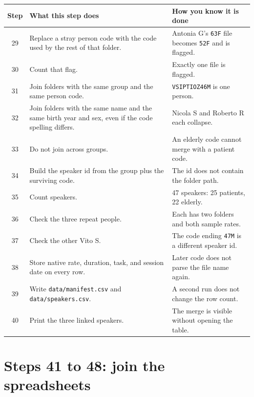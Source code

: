 \documentclass[11pt]{article}
\begin{document}
\begin{longtable}{cp{6.4cm}p{6.4cm}}
\toprule
Step & What this step does & How you know it is done \\
\midrule
\endhead
29 & Replace a stray person code with the code used by the rest of that folder. & Antonia G's \texttt{63F} file becomes \texttt{52F} and is flagged. \\
30 & Count that flag. & Exactly one file is flagged. \\
31 & Join folders with the same group and the same person code. & \texttt{VSIPTIOZ46M} is one person. \\
32 & Join folders with the same name and the same birth year and sex, even if the code spelling differs. & Nicola S and Roberto R each collapse. \\
33 & Do not join across groups. & An elderly code cannot merge with a patient code. \\
34 & Build the speaker id from the group plus the surviving code. & The id does not contain the folder path. \\
35 & Count speakers. & 47 speakers: 25 patients, 22 elderly. \\
36 & Check the three repeat people. & Each has two folders and both sample rates. \\
37 & Check the other Vito S. & The code ending \texttt{47M} is a different speaker id. \\
38 & Store native rate, duration, task, and session date on every row. & Later code does not parse the file name again. \\
39 & Write \texttt{data/manifest.csv} and \texttt{data/speakers.csv}. & A second run does not change the row count. \\
40 & Print the three linked speakers. & The merge is visible without opening the table. \\
\bottomrule
\end{longtable}

\section{Steps 41 to 48: join the spreadsheets}
\end{document}
